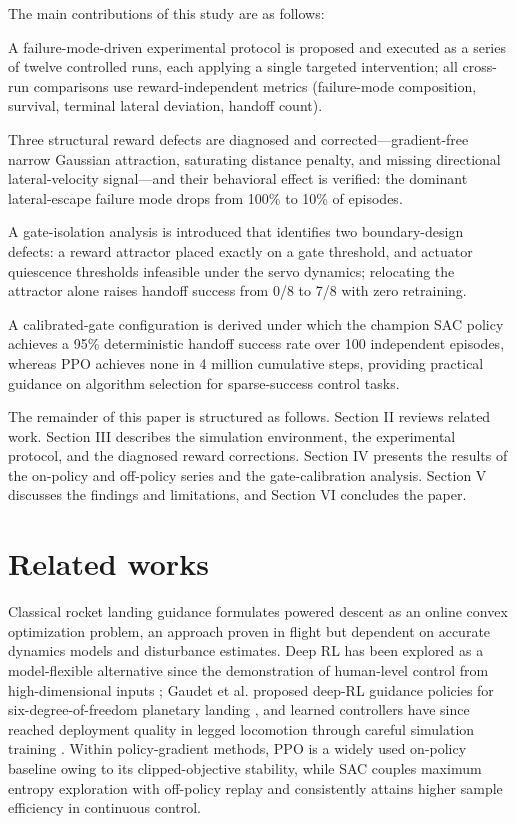 \documentclass[11pt,a4paper]{article}
\begin{document}
The main contributions of this study are as follows:

A failure-mode-driven experimental protocol is proposed and executed as a series of twelve controlled runs, each applying a single targeted intervention; all cross-run comparisons use reward-independent metrics (failure-mode composition, survival, terminal lateral deviation, handoff count).

Three structural reward defects are diagnosed and corrected---gradient-free narrow Gaussian attraction, saturating distance penalty, and missing directional lateral-velocity signal---and their behavioral effect is verified: the dominant lateral-escape failure mode drops from 100\% to 10\% of episodes.

A gate-isolation analysis is introduced that identifies two boundary-design defects: a reward attractor placed exactly on a gate threshold, and actuator quiescence thresholds infeasible under the servo dynamics; relocating the attractor alone raises handoff success from 0/8 to 7/8 with zero retraining.

A calibrated-gate configuration is derived under which the champion SAC policy achieves a 95\% deterministic handoff success rate over 100 independent episodes, whereas PPO achieves none in 4 million cumulative steps, providing practical guidance on algorithm selection for sparse-success control tasks.

The remainder of this paper is structured as follows. Section II reviews related work. Section III describes the simulation environment, the experimental protocol, and the diagnosed reward corrections. Section IV presents the results of the on-policy and off-policy series and the gate-calibration analysis. Section V discusses the findings and limitations, and Section VI concludes the paper.


\section{Related works}

Classical rocket landing guidance formulates powered descent as an online convex optimization problem, an approach proven in flight \cite{blackmore2016landing} but dependent on accurate dynamics models and disturbance estimates. Deep RL has been explored as a model-flexible alternative since the demonstration of human-level control from high-dimensional inputs \cite{mnih2015nature}; Gaudet et al. proposed deep-RL guidance policies for six-degree-of-freedom planetary landing \cite{gaudet2020landing}, and learned controllers have since reached deployment quality in legged locomotion through careful simulation training \cite{hwangbo2019robotics}. Within policy-gradient methods, PPO \cite{schulman2017ppo} is a widely used on-policy baseline owing to its clipped-objective stability, while SAC \cite{haarnoja2018sac} couples maximum entropy exploration with off-policy replay and consistently attains higher sample efficiency in continuous control.
\end{document}
